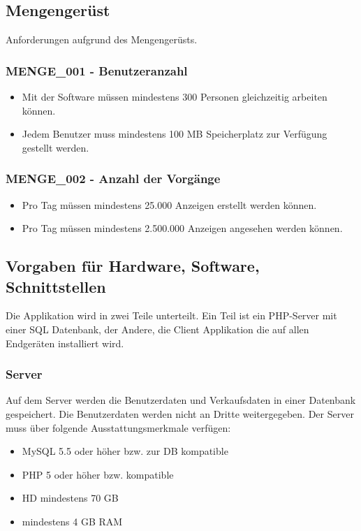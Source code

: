 \documentclass[a4paper,12pt,oneside]{scrartcl}
\begin{document}
\subsection{Mengengerüst}
Anforderungen aufgrund des Mengengerüsts. 

\subsubsection*{MENGE\_001 - Benutzeranzahl}
\begin{itemize}
	\item Mit der Software müssen mindestens 300 Personen gleichzeitig arbeiten können. 
	\item Jedem Benutzer muss mindestens 100 MB Speicherplatz zur Verfügung gestellt werden. 
\end{itemize}

\subsubsection*{MENGE\_002 - Anzahl der Vorgänge }
\begin{itemize}
	\item Pro Tag müssen mindestens 25.000 Anzeigen erstellt werden können. 
	\item Pro Tag müssen mindestens 2.500.000 Anzeigen angesehen werden können.
\end{itemize}


\subsection{Vorgaben für Hardware, Software, Schnittstellen}
Die Applikation wird in zwei Teile unterteilt.
Ein Teil ist ein PHP-Server mit einer SQL Datenbank, der Andere, die Client Applikation die auf allen Endgeräten installiert wird.

\subsubsection*{Server}
Auf dem Server werden die Benutzerdaten und Verkaufsdaten in einer Datenbank gespeichert.
Die Benutzerdaten werden nicht an Dritte weitergegeben.
Der Server muss über folgende Ausstattungsmerkmale verfügen:
\begin{itemize}
	\item MySQL 5.5 oder höher bzw. zur DB kompatible
	\item PHP 5 oder höher bzw. kompatible
	\item HD mindestens 70 GB
	\item mindestens 4 GB RAM
\end{itemize}
\end{document}
